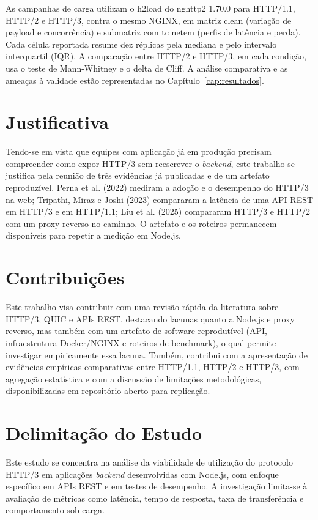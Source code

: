 As campanhas de carga utilizam o h2load do nghttp2 1.70.0 para HTTP/1.1, HTTP/2 e HTTP/3, contra o mesmo NGINX, em matriz clean (variação de payload e concorrência) e submatriz com tc netem (perfis de latência e perda). Cada célula reportada resume dez réplicas pela mediana e pelo intervalo interquartil (IQR). A comparação entre HTTP/2 e HTTP/3, em cada condição, usa o teste de Mann-Whitney e o delta de Cliff. A análise comparativa e as ameaças à validade estão representadas no Capítulo~\ref{cap:resultados}.

\section{Justificativa}

Tendo-se em vista que equipes com aplicação já em produção precisam compreender como expor HTTP/3 sem reescrever o \textit{backend}, este trabalho se justifica pela reunião de três evidências já publicadas e de um artefato reproduzível. Perna et al. (2022) mediram a adoção e o desempenho do HTTP/3 na web; Tripathi, Miraz e Joshi (2023) compararam a latência de uma API REST em HTTP/3 e em HTTP/1.1; Liu et al. (2025) compararam HTTP/3 e HTTP/2 com um proxy reverso no caminho. O artefato e os roteiros permanecem disponíveis para repetir a medição em Node.js. 

\section{Contribuições}

Este trabalho visa contribuir com uma revisão rápida da literatura sobre HTTP/3, QUIC e APIs REST, destacando lacunas quanto a Node.js e proxy reverso, mas também com um artefato de software reprodutível (API, infraestrutura Docker/NGINX e roteiros de benchmark), o qual permite investigar empiricamente essa lacuna. Também, contribui com a apresentação de evidências empíricas comparativas entre HTTP/1.1, HTTP/2 e HTTP/3, com agregação estatística e com a discussão de limitações metodológicas, disponibilizadas em repositório aberto para replicação.

\section{Delimitação do Estudo}\label{sec:delimitacao}

Este estudo se concentra na análise da viabilidade de utilização do protocolo HTTP/3 em aplicações \textit{backend} desenvolvidas com Node.js, com enfoque específico em APIs REST e em testes de desempenho. A investigação limita-se à avaliação de métricas como latência, tempo de resposta, taxa de transferência e comportamento sob carga.

